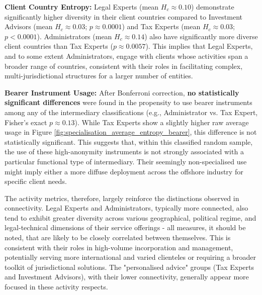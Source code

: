 \textbf{Client Country Entropy:}
Legal Experts (mean $H_c \approx 0.10$) demonstrate significantly higher diversity in their client countries compared to Investment Advisors (mean $H_c \approx 0.03$; $p \approx 0.0001$) and Tax Experts (mean $H_c \approx 0.03$; $p < 0.0001$). Administrators (mean $H_c \approx 0.14$) also have significantly more diverse client countries than Tax Experts ($p \approx 0.0057$). This implies that Legal Experts, and to some extent Administrators, engage with clients whose activities span a broader range of countries, consistent with their roles in facilitating complex, multi-jurisdictional structures for a larger number of entities.

\textbf{Bearer Instrument Usage:}
After Bonferroni correction, \textbf{no statistically significant differences} were found in the propensity to use bearer instruments among any of the intermediary classifications (e.g., Administrator vs. Tax Expert, Fisher's exact $p \approx 0.13$). While Tax Experts show a slightly higher raw average usage in Figure \ref{fig:specialisation_average_entropy_bearer}, this difference is not statistically significant. This suggests that, within this classified random sample, the use of these high-anonymity instruments is not strongly associated with a particular functional type of intermediary. Their seemingly non-specialised use might imply either a more diffuse deployment across the offshore industry for specific client needs.

The activity metrics, therefore, largely reinforce the distinctions observed in connectivity. Legal Experts and Administrators, typically more connected, also tend to exhibit greater diversity across various geographical, political regime, and legal-technical dimensions of their service offerings - all measures, it should be noted, that are likely to be closely correlated between themselves. This is consistent with their roles in high-volume incorporation and management, potentially serving more international and varied clienteles or requiring a broader toolkit of jurisdictional solutions. The "personalised advice" groups (Tax Experts and Investment Advisors), with their lower connectivity, generally appear more focused in these activity respects. 


